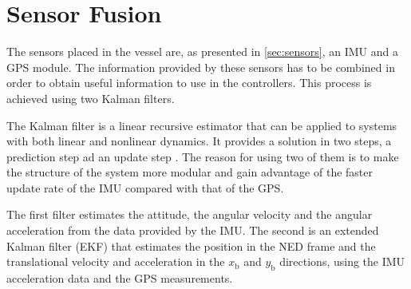 \chapter{Sensor Fusion}\label{chap:sensorFusion}
The sensors placed in the vessel are, as presented in \autoref{sec:sensors}, an IMU and a GPS module. The information provided by these sensors has to be combined in order to obtain useful information to use in the controllers. This process is achieved using two Kalman filters. 

The Kalman filter is a linear recursive estimator that can be applied to systems with both linear and nonlinear dynamics. It provides a solution in two steps, a prediction step ad an update step \cite{SHaykin}. The reason for using two of them is to make the structure of the system more modular and gain advantage of the faster update rate of the IMU compared with that of the GPS.

The first filter estimates the attitude, the angular velocity and the angular acceleration from the data provided by the IMU. The second is an extended Kalman filter (EKF) that estimates the position in the NED frame and the translational velocity and acceleration in the $x_\mathrm{b}$ and $y_\mathrm{b}$ directions, using the IMU acceleration data and the GPS measurements.